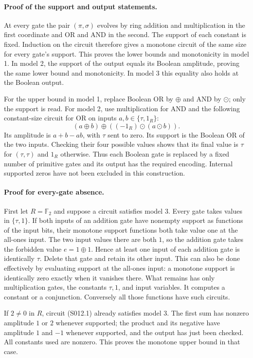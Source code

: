 \paragraph{Proof of the support and output statements.}
At every gate the pair $(\pi,\sigma)$ evolves by ring addition and
multiplication in the first coordinate and OR and AND in the second.
The support of each constant is fixed. Induction on the circuit therefore
gives a monotone circuit of the same size for every gate's support.
This proves the lower bounds and monotonicity in model 1. In model 2,
the support of the output equals its Boolean amplitude, proving the same
lower bound and monotonicity. In model 3 this equality also holds at the
Boolean output.

For the upper bound in model 1, replace Boolean OR by $\oplus$ and AND
by $\odot$; only the support is read. For model 2, use multiplication
for AND and the following constant-size circuit for OR on inputs
$a,b\in\{\tau,1_R\}$:
\[
 (a\oplus b)\oplus((-1_R)\odot(a\odot b)).             \tag{S012.1}
\]
Its amplitude is $a+b-ab$, with $\tau$ sent to zero. Its support is
the Boolean OR of the two inputs. Checking their four possible values
shows that its final value is $\tau$ for $(\tau,\tau)$ and $1_R$
otherwise. Thus each Boolean gate is replaced by a fixed number of
primitive gates and its output has the required encoding. Internal
supported zeros have not been excluded in this construction.

\paragraph{Proof for every-gate absence.}
First let $R=\mathbb F_2$ and suppose a circuit satisfies model 3.
Every gate takes values in $\{\tau,1\}$. If both inputs of an addition
gate have nonempty support as functions of the input bits, their
monotone support functions both take value one at the all-ones input.
The two input values there are both $1$, so the addition gate takes
the forbidden value $e=1\oplus1$. Hence at least one input of each
addition gate is identically $\tau$. Delete that gate and retain its
other input. This can also be done effectively by evaluating support
at the all-ones input: a monotone support is identically zero exactly
when it vanishes there. What remains has only multiplication gates,
the constants $\tau,1$, and input variables. It computes a constant
or a conjunction. Conversely all those functions have such circuits.

If $2\ne0$ in $R$, circuit (S012.1) already satisfies model 3.
The first sum has nonzero amplitude $1$ or $2$ whenever supported;
the product and its negative have amplitude $1$ and $-1$ whenever
supported, and the output has just been checked. All constants used
are nonzero. This proves the monotone upper bound in that case.

